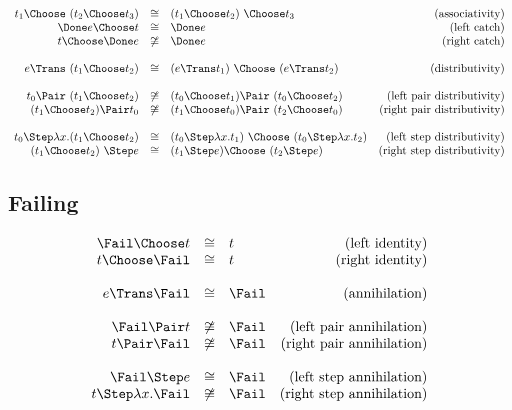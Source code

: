 \begin{equation*}
  \begin{array}{rclr}
    t_1 \Choose\ (t_2 \Choose t_3)
      &\cong& (t_1 \Choose t_2)\ \Choose t_3
      & \text{(associativity)} \\
    \Done e \Choose t
      &\cong& \Done e
      & \text{(left catch)} \\
    t \Choose \Done e
      &\not\cong& \Done e
      & \text{(right catch)} \\
    & & & \\
    e \Trans\ (t_1 \Choose t_2)
      &\cong& (e \Trans t_1)\ \Choose\ (e \Trans t_2)
      & \text{(distributivity)} \\
    & & & \\
    t_0 \Pair\ (t_1 \Choose t_2)
      &\not\cong& (t_0 \Choose t_1) \Pair\ (t_0 \Choose t_2)
      & \text{(left pair distributivity)} \\
    (t_1 \Choose t_2) \Pair t_0
      &\not\cong& (t_1 \Choose t_0) \Pair\ (t_2 \Choose t_0)
      & \text{(right pair distributivity)} \\
    & & & \\
    t_0 \Step \lambda x. (t_1 \Choose t_2)
      &\cong& (t_0 \Step \lambda x. t_1)\ \Choose\ (t_0 \Step \lambda x. t_2)
      & \text{(left step distributivity)} \\
    (t_1 \Choose t_2)\ \Step e
      &\cong& (t_1 \Step e) \Choose\ (t_2 \Step e)
      & \text{(right step distributivity)} \\
  \end{array}
\end{equation*}

\subsection{Failing}

\begin{equation*}
  \begin{array}{rclr}
    \Fail \Choose t
      &\cong& t
      & \text{(left identity)} \\
    t \Choose \Fail
      &\cong& t
      & \text{(right identity)} \\
    & & & \\
    e \Trans \Fail
      &\cong& \Fail
      & \text{(annihilation)} \\
    & & & \\
    \Fail \Pair t
      &\not\cong& \Fail
      & \text{(left pair annihilation)} \\
    t \Pair \Fail
      &\not\cong& \Fail
      & \text{(right pair annihilation)} \\
    & & & \\
    \Fail \Step e
      &\cong& \Fail
      & \text{(left step annihilation)} \\
    t \Step \lambda x. \Fail
      &\not\cong& \Fail
      & \text{(right step annihilation)} \\
  \end{array}
\end{equation*}


